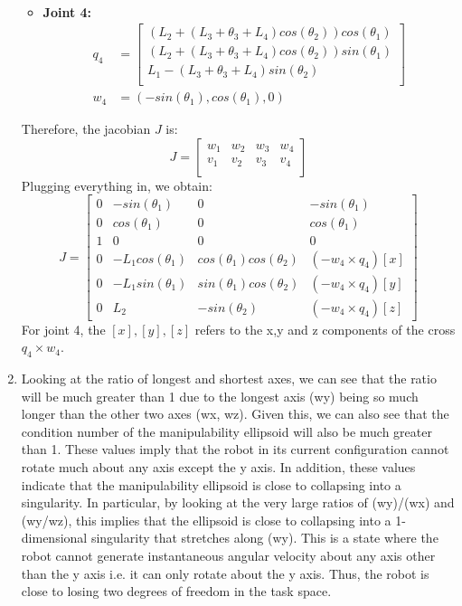 \documentclass{article}
\begin{document}
\begin{enumerate}
\begin{itemize}
\begin{align}
        \end{align}
        \item \textbf{Joint 4:}\\
        \begin{align}
            q_4 &= \begin{bmatrix}
              (L_2+(L_3+\theta_3+L_4)cos(\theta_2))cos(\theta_1) \\
               (L_2+(L_3+\theta_3+L_4)cos(\theta_2))sin(\theta_1)\\
               L_1-(L_3+\theta_3+L_4)sin(\theta_2)\\
             \end{bmatrix}\\
            w_4 &= (-sin(\theta_1),cos(\theta_1),0)
        \end{align}
    \end{itemize}
    Therefore, the jacobian $J$ is:
    $$J=\begin{bmatrix} w_1 & w_2 & w_3 & w_4 \\
    v_1 & v_2 & v_3 & v_4 \\
    \end{bmatrix}$$
    Plugging everything in, we obtain:
$$J=\begin{bmatrix} 
0 &-sin(\theta_1)  & 0 & -sin(\theta_1) \\
0 & cos(\theta_1)& 0 & cos(\theta_1)\\
1 & 0& 0 & 0\\
0 & -L_1cos(\theta_1)& cos(\theta_1)cos(\theta_2) &  (-w_4 \times q_4)[x]\\
0 & -L_1 sin(\theta_1)& sin(\theta_1)cos(\theta_2) & (-w_4 \times q_4)[y]\\
0 & L_2&  -sin(\theta_2) & (-w_4 \times q_4)[z]

    \end{bmatrix}$$
    For joint 4, the $[x],[y],[z]$ refers to the x,y and z components of the cross $q_4 \times w_4$.
    \item Looking at the ratio of longest and shortest axes, we can see that the ratio will be much greater than 1 due to the longest axis (wy) being so much longer than the other two axes (wx, wz). Given this, we can also see that the condition number of the manipulability ellipsoid will also be much greater than 1. These values imply that the robot in its current configuration cannot rotate much about any axis except the y axis. In addition, these values indicate that  the manipulability ellipsoid is close to collapsing into a singularity. In particular, by looking at the very large ratios of (wy)/(wx) and (wy/wz), this implies that the ellipsoid is close to collapsing into a 1-dimensional singularity that stretches along (wy). This is a state where the robot cannot generate instantaneous angular velocity about any axis other than the y axis i.e. it can only rotate about the y axis. Thus, the robot is close to losing two degrees of freedom in the task space.
\end{enumerate}
\end{document}

